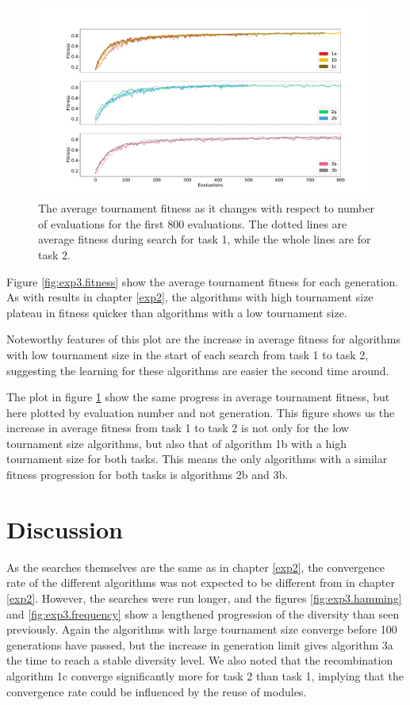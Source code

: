 \begin{figure}
    \includegraphics[width=1.25\textwidth, center]{Chapters/4.Experiments/exp3/figures/fitness_by_evaluations.pdf}
    \caption[Average tournament fitness plotted by evaluation]{The average tournament fitness as it changes with respect to number of evaluations for the first 800 evaluations. The dotted lines are average fitness during search for task 1, while the whole lines are for task 2.}
    \label{fig:exp3.fitness_by_evaluations}
\end{figure}

Figure \ref{fig:exp3.fitness} show the average tournament fitness for each generation. As with results in chapter \ref{exp2}, the algorithms with high tournament size plateau in fitness quicker than algorithms with a low tournament size.

Noteworthy features of this plot are the increase in average fitness for algorithms with low tournament size in the start of each search from task 1 to task 2, suggesting the learning for these algorithms are easier the second time around. 

The plot in figure \ref{fig:exp3.fitness_by_evaluations} show the same progress in average tournament fitness, but here plotted by evaluation number and not generation. This figure shows us the increase in average fitness from task 1 to task 2 is not only for the low tournament size algorithms, but also that of algorithm 1b with a high tournament size for both tasks. This means the only algorithms with a similar fitness progression for both tasks is algorithms 2b and 3b. 

\section{Discussion}
As the searches themselves are the same as in chapter \ref{exp2}, the convergence rate of the different algorithms was not expected to be different from in chapter \ref{exp2}. However, the searches were run longer, and the figures \ref{fig:exp3.hamming} and \ref{fig:exp3.frequency} show a lengthened progression of the diversity than seen previously. Again the algorithms with large tournament size converge before 100 generations have passed, but the increase in generation limit gives algorithm 3a the time to reach a stable diversity level. We also noted that the recombination algorithm 1c converge significantly more for task 2 than task 1, implying that the convergence rate could be influenced by the reuse of modules. 

